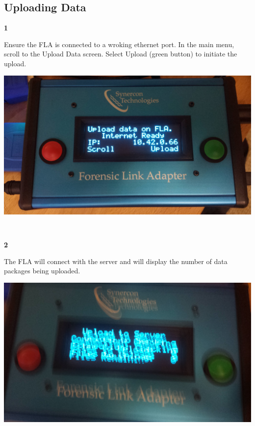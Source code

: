 \documentclass[11pt]{article}
\begin{document}
\subsection{Uploading Data}
\label{subsec:upload_data}
\noindent\begin{minipage}{0.3\textwidth}%
\begin{center}
\textbf{1}\\[\baselineskip]
\end{center}
Ensure the FLA is connected to a wroking ethernet port. In the main menu, scroll to the Upload Data screen. Select Upload (green button) to initiate the upload.
\end{minipage}%
\hfill%
\begin{minipage}{0.6\textwidth}
\includegraphics[width=\linewidth]{../media/fla_screens/upload_ready}
\end{minipage}
\\[\baselineskip]
\noindent\begin{minipage}{0.3\textwidth}%
\begin{center}
\textbf{2}\\[\baselineskip]
\end{center}
The FLA will connect with the server and will display the number of data packages being uploaded.
\end{minipage}%
\hfill%
\begin{minipage}{0.6\textwidth}
\includegraphics[width=\linewidth]{../media/fla_screens/upload_checking}
\end{minipage}
\end{document}
